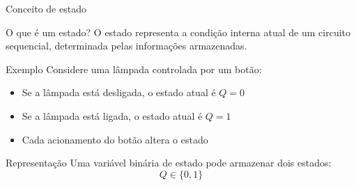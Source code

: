 

\begin{frame}{Conceito de estado}

    \begin{block}{O que é um estado?}
        O estado representa a condição interna atual de um circuito
        sequencial, determinada pelas informações armazenadas.
    \end{block}

    \begin{alertblock}{Exemplo}
        Considere uma lâmpada controlada por um botão:
        \begin{itemize}
            \item Se a lâmpada está desligada, o estado atual é $Q=0$
            \item Se a lâmpada está ligada, o estado atual é $Q=1$
            \item Cada acionamento do botão altera o estado
        \end{itemize}
    \end{alertblock}

    \begin{block}{Representação}
        Uma variável binária de estado pode armazenar dois estados:
        \[
            Q \in \{0,1\}
        \]
    \end{block}

\end{frame}